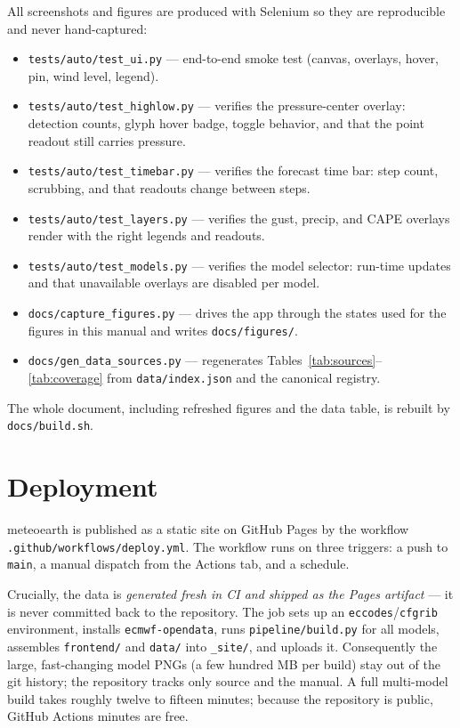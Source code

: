 \documentclass[11pt,letterpaper]{article}
\begin{document}
All screenshots and figures are produced with Selenium so they are reproducible
and never hand-captured:
\begin{itemize}
  \item \texttt{tests/auto/test\_ui.py} --- end-to-end smoke test (canvas,
        overlays, hover, pin, wind level, legend).
  \item \texttt{tests/auto/test\_highlow.py} --- verifies the pressure-center
        overlay: detection counts, glyph hover badge, toggle behavior, and that
        the point readout still carries pressure.
  \item \texttt{tests/auto/test\_timebar.py} --- verifies the forecast time bar:
        step count, scrubbing, and that readouts change between steps.
  \item \texttt{tests/auto/test\_layers.py} --- verifies the gust, precip, and
        CAPE overlays render with the right legends and readouts.
  \item \texttt{tests/auto/test\_models.py} --- verifies the model selector:
        run-time updates and that unavailable overlays are disabled per model.
  \item \texttt{docs/capture\_figures.py} --- drives the app through the states
        used for the figures in this manual and writes \texttt{docs/figures/}.
  \item \texttt{docs/gen\_data\_sources.py} --- regenerates
        Tables~\ref{tab:sources}--\ref{tab:coverage} from \texttt{data/index.json}
        and the canonical registry.
\end{itemize}

The whole document, including refreshed figures and the data table, is rebuilt by
\texttt{docs/build.sh}.

\section{Deployment}
\label{sec:deploy}

meteoearth is published as a static site on GitHub Pages by the workflow
\texttt{.github/workflows/deploy.yml}. The workflow runs on three triggers: a
push to \texttt{main}, a manual dispatch from the Actions tab, and a schedule.

Crucially, the data is \emph{generated fresh in CI and shipped as the Pages
artifact} --- it is never committed back to the repository. The job sets up an
\texttt{eccodes}/\texttt{cfgrib} environment, installs \texttt{ecmwf-opendata},
runs \texttt{pipeline/build.py} for all models, assembles \texttt{frontend/} and
\texttt{data/} into \texttt{\_site/}, and uploads it. Consequently the large,
fast-changing model PNGs (a few hundred MB per build) stay out of the git
history; the repository tracks only source and the manual. A full multi-model
build takes roughly twelve to fifteen minutes; because the repository is public,
GitHub Actions minutes are free.
\end{document}
